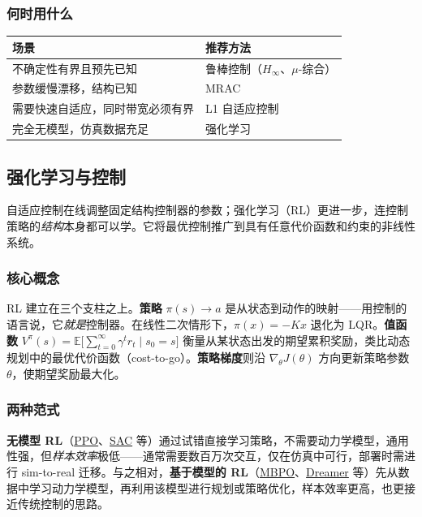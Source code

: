 \subsubsection{何时用什么}

\begin{center}
\small
\begin{tabular}{l l}
\toprule
\textbf{场景} & \textbf{推荐方法} \\
\midrule
不确定性有界且预先已知 & 鲁棒控制（$H_\infty$、$\mu$-综合） \\
参数缓慢漂移，结构已知 & MRAC \\
需要快速自适应，同时带宽必须有界 & L1 自适应控制 \\
完全无模型，仿真数据充足 & 强化学习 \\
\bottomrule
\end{tabular}
\end{center}

\subsection{强化学习与控制}

自适应控制在线调整固定结构控制器的参数；强化学习（RL）更进一步，连控制策略的\emph{结构}本身都可以学。它将最优控制推广到具有任意代价函数和约束的非线性系统。

\subsubsection{核心概念}

RL 建立在三个支柱之上。\textbf{策略} $\pi(s) \to a$ 是从状态到动作的映射------用控制的语言说，它\emph{就是}控制器。在线性二次情形下，$\pi(x) = -Kx$ 退化为 LQR。\textbf{值函数} $V^\pi(s) = \mathbb{E}\bigl[\sum_{t=0}^{\infty} \gamma^t r_t \mid s_0 = s\bigr]$ 衡量从某状态出发的期望累积奖励，类比动态规划中的最优代价函数（cost-to-go）。\textbf{策略梯度}则沿 $\nabla_\theta J(\theta)$ 方向更新策略参数 $\theta$，使期望奖励最大化。

\subsubsection{两种范式}

\textbf{无模型 RL}（\href{https://arxiv.org/abs/1707.06347}{PPO}、\href{https://arxiv.org/abs/1801.01290}{SAC} 等）通过试错直接学习策略，不需要动力学模型，通用性强，但\emph{样本效率}极低------通常需要数百万次交互，仅在仿真中可行，部署时需进行 sim-to-real 迁移。与之相对，\textbf{基于模型的 RL}（\href{https://arxiv.org/abs/1906.08253}{MBPO}、\href{https://arxiv.org/abs/1912.01603}{Dreamer} 等）先从数据中学习动力学模型，再利用该模型进行规划或策略优化，样本效率更高，也更接近传统控制的思路。

